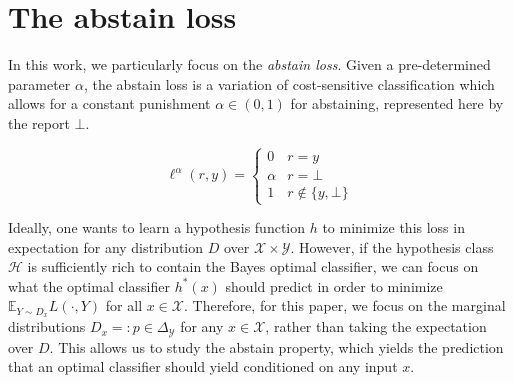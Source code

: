 \documentclass[anon,12pt]{colt2021} %
\newcommand{\Comments}{1}
\newcommand{\mynote}[2]{\ifnum\Comments=1\textcolor{#1}{#2}\fi}
\newcommand{\jessie}[1]{\mynote{teal}{[JF: #1]}}
\newcommand{\reals}{\mathbb{R}}
\newcommand{\simplex}{\Delta_\Y}
\newcommand{\E}{\mathbb{E}}
\renewcommand{\H}{\mathcal{H}}
\newcommand{\R}{\mathcal{R}}
\newcommand{\X}{\mathcal{X}}
\newcommand{\Y}{\mathcal{Y}}
\newcommand{\toto}{\rightrightarrows}
\DeclareMathOperator*{\arginf}{arg\,inf}
\begin{document}

\section{The abstain loss}
In this work, we particularly focus on the \emph{abstain loss}.
Given a pre-determined parameter $\alpha$, the abstain loss is a variation of cost-sensitive classification which allows for a constant punishment $\alpha \in (0,1)$ for abstaining, represented here by the report $\bot$.

\begin{equation}
\ell^\alpha(r,y) = \begin{cases}
0 & r = y \\
\alpha & r = \bot\\
1 & r \not \in \{y, \bot\}
\end{cases}\tag*{Abstain loss}
\end{equation} 

Ideally, one wants to learn a hypothesis function $h$ to minimize this loss in expectation for any distribution $D$ over $\X \times \Y$.
However, if the hypothesis class $\H$ is sufficiently rich to contain the Bayes optimal classifier, we can focus on what the optimal classifier $h^*(x)$ should predict in order to minimize $\E_{Y \sim D_x} L(\cdot, Y)$ for all $x \in \X$.
Therefore, for this paper, we focus on the marginal distributions $D_x =: p \in \simplex$ for any $x \in \X$, rather than taking the expectation over $D$.
This allows us to study the abstain property, which yields the prediction that an optimal classifier should yield conditioned on any input $x$.
\end{document}
